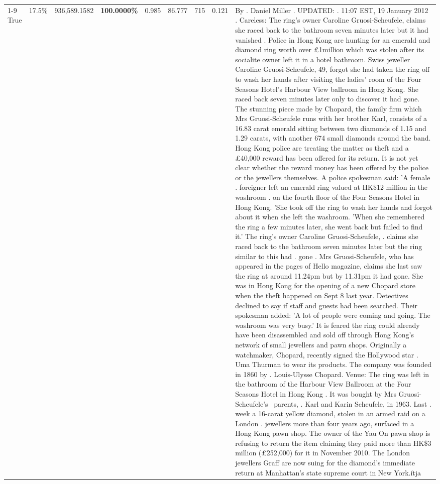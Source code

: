 \begin{table}[H]
\begin{tabular}{lllrlllll}
\cline{1-9} \cline{2-9}
True & 17.5\% & 936,589.1582 & \bfseries \color{red} 100.0000\% & 0.985 & 86.777 & 715 & 0.121 & By . Daniel Miller . UPDATED: . 11:07 EST, 19 January 2012 . Careless: The ring's owner Caroline Gruosi-Scheufele, claims she raced back to the bathroom seven minutes later but it had vanished . Police in Hong Kong are hunting for an emerald and diamond ring worth over £1million which was stolen after its socialite owner left it in a hotel bathroom. Swiss jeweller Caroline Gruosi-Scheufele, 49, forgot she had taken the ring off to wash her hands after visiting the ladies' room of the Four Seasons Hotel's Harbour View ballroom in Hong Kong. She raced back seven minutes later only to discover it had gone. The stunning piece made by Chopard, the family firm which Mrs Gruosi-Scheufele runs with her brother Karl, consists of a 16.83 carat emerald sitting between two diamonds of 1.15 and 1.29 carats, with another 674 small diamonds around the band. Hong Kong police are treating the matter as theft and a £40,000 reward has been offered for its return. It is not yet clear whether the reward money has been offered by the police or the jewellers themselves. A police spokesman said: 'A female . foreigner left an emerald ring valued at HK\$12 million in the washroom . on the fourth floor of the Four Seasons Hotel in Hong Kong. 'She took off the ring to wash her hands and forgot about it when she left the washroom. 'When she remembered the ring a few minutes later, she went back but failed to find it.' The ring's owner Caroline Gruosi-Scheufele, . claims she raced back to the bathroom seven minutes later but the ring similar to this had . gone . Mrs Gruosi-Scheufele, who has appeared in the pages of Hello magazine, claims she last saw the ring at around 11.24pm but by 11.31pm it had gone. She was in Hong Kong for the opening of a new Chopard store when the theft happened on Sept 8 last year. Detectives declined to say if staff and guests had been searched. Their spokesman added: 'A lot of people were coming and going. The washroom was very busy.' It is feared the ring could already have been disassembled and sold off through Hong Kong's network of small jewellers and pawn shops. Originally a watchmaker, Chopard, recently signed the Hollywood star . Uma Thurman to wear its products. The company was founded in 1860 by . Louis-Ulysse Chopard. Venue: The ring was left in the bathroom of the Harbour View Ballroom at the Four Seasons Hotel in Hong Kong . It was bought by Mrs Gruosi-Scheufele's  parents, . Karl and Karin Scheufele, in 1963. Last . week a 16-carat yellow diamond, stolen in an armed raid on a London . jewellers more than four years ago, surfaced in a Hong Kong pawn shop. The owner of the Yau On pawn shop is refusing to return the item claiming they paid more than HK\$3 million (£252,000) for it in November 2010. The London jewellers Graff are now suing for the diamond’s immediate return at Manhattan’s state supreme court in New York.ítja \\

\end{tabular}
\end{table}
